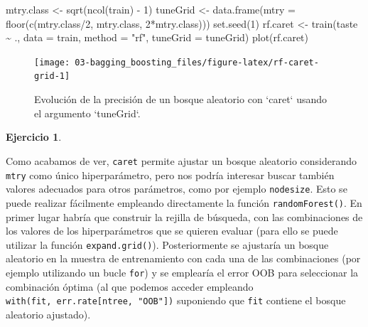 \documentclass[
  spanish,
]{book}
\newenvironment{Shaded}{\begin{snugshade}}{\end{snugshade}}
\newcommand{\AttributeTok}[1]{\textcolor[rgb]{0.77,0.63,0.00}{#1}}
\newcommand{\DecValTok}[1]{\textcolor[rgb]{0.00,0.00,0.81}{#1}}
\newcommand{\FunctionTok}[1]{\textcolor[rgb]{0.00,0.00,0.00}{#1}}
\newcommand{\NormalTok}[1]{#1}
\newcommand{\OtherTok}[1]{\textcolor[rgb]{0.56,0.35,0.01}{#1}}
\newcommand{\SpecialCharTok}[1]{\textcolor[rgb]{0.00,0.00,0.00}{#1}}
\newcommand{\StringTok}[1]{\textcolor[rgb]{0.31,0.60,0.02}{#1}}
\theoremstyle{break}
\theoremstyle{definition}
\theoremstyle{definition}
\theoremstyle{definition}
\newtheorem{exercise}{Ejercicio}[chapter]
\theoremstyle{definition}
\theoremstyle{remark}
\begin{document}
\begin{Shaded}
\begin{Highlighting}[]
\NormalTok{mtry.class }\OtherTok{\textless{}{-}} \FunctionTok{sqrt}\NormalTok{(}\FunctionTok{ncol}\NormalTok{(train) }\SpecialCharTok{{-}} \DecValTok{1}\NormalTok{)}
\NormalTok{tuneGrid }\OtherTok{\textless{}{-}} \FunctionTok{data.frame}\NormalTok{(}\AttributeTok{mtry =} \FunctionTok{floor}\NormalTok{(}\FunctionTok{c}\NormalTok{(mtry.class}\SpecialCharTok{/}\DecValTok{2}\NormalTok{, mtry.class, }\DecValTok{2}\SpecialCharTok{*}\NormalTok{mtry.class)))}
\FunctionTok{set.seed}\NormalTok{(}\DecValTok{1}\NormalTok{)}
\NormalTok{rf.caret }\OtherTok{\textless{}{-}} \FunctionTok{train}\NormalTok{(taste }\SpecialCharTok{\textasciitilde{}}\NormalTok{ ., }\AttributeTok{data =}\NormalTok{ train,}
                  \AttributeTok{method =} \StringTok{"rf"}\NormalTok{, }\AttributeTok{tuneGrid =}\NormalTok{ tuneGrid)}
\FunctionTok{plot}\NormalTok{(rf.caret)}
\end{Highlighting}
\end{Shaded}

\begin{figure}[!htb]

{\centering \texttt{[image: 03-bagging\_boosting\_files/figure-latex/rf-caret-grid-1]} 

}

\caption{Evolución de la precisión de un bosque aleatorio con `caret` usando el argumento `tuneGrid`.}\label{fig:rf-caret-grid}
\end{figure}

\begin{exercise}
\protect\hypertarget{exr:rf-tunegrid}{}{\label{exr:rf-tunegrid} }
\end{exercise}

Como acabamos de ver, \texttt{caret} permite ajustar un bosque aleatorio considerando \texttt{mtry} como único hiperparámetro, pero nos podría interesar buscar también valores adecuados para otros parámetros, como por ejemplo \texttt{nodesize}.
Esto se puede realizar fácilmente empleando directamente la función \texttt{randomForest()}.
En primer lugar habría que construir la rejilla de búsqueda, con las combinaciones de los valores de los hiperparámetros que se quieren evaluar (para ello se puede utilizar la función \texttt{expand.grid()}).
Posteriormente se ajustaría un bosque aleatorio en la muestra de entrenamiento con cada una de las combinaciones (por ejemplo utilizando un bucle \texttt{for}) y se emplearía el error OOB para seleccionar la combinación óptima (al que podemos acceder empleando \texttt{with(fit,\ err.rate{[}ntree,\ "OOB"{]})} suponiendo que \texttt{fit} contiene el bosque aleatorio ajustado).
\end{document}
